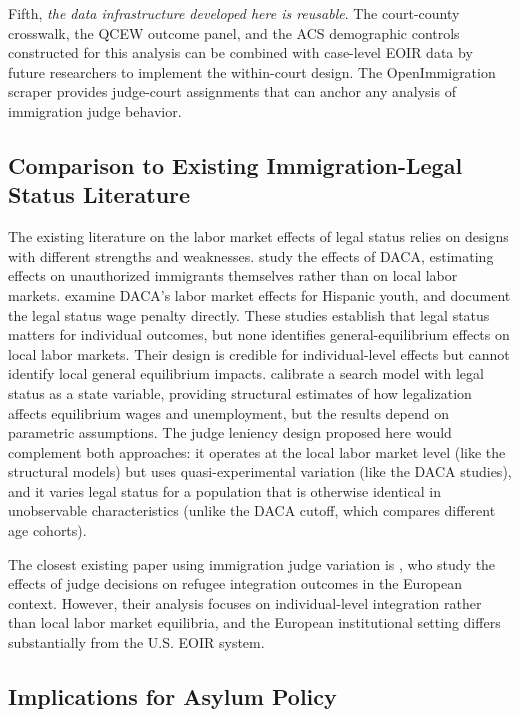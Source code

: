 \documentclass[12pt]{article}
\begin{document}
Fifth, \textit{the data infrastructure developed here is reusable}. The court-county crosswalk, the QCEW outcome panel, and the ACS demographic controls constructed for this analysis can be combined with case-level EOIR data by future researchers to implement the within-court design. The OpenImmigration scraper provides judge-court assignments that can anchor any analysis of immigration judge behavior.

\subsection{Comparison to Existing Immigration-Legal Status Literature}

The existing literature on the labor market effects of legal status relies on designs with different strengths and weaknesses. \citet{becker2022legal} study the effects of DACA, estimating effects on unauthorized immigrants themselves rather than on local labor markets. \citet{amuedodorantes2020daca} examine DACA's labor market effects for Hispanic youth, and \citet{orrenius2015wage} document the legal status wage penalty directly. These studies establish that legal status matters for individual outcomes, but none identifies general-equilibrium effects on local labor markets. Their design is credible for individual-level effects but cannot identify local general equilibrium impacts. \citet{chassamboulli2014labor} calibrate a search model with legal status as a state variable, providing structural estimates of how legalization affects equilibrium wages and unemployment, but the results depend on parametric assumptions. The judge leniency design proposed here would complement both approaches: it operates at the local labor market level (like the structural models) but uses quasi-experimental variation (like the DACA studies), and it varies legal status for a population that is otherwise identical in unobservable characteristics (unlike the DACA cutoff, which compares different age cohorts).

The closest existing paper using immigration judge variation is \citet{khan2023immigration}, who study the effects of judge decisions on refugee integration outcomes in the European context. However, their analysis focuses on individual-level integration rather than local labor market equilibria, and the European institutional setting differs substantially from the U.S. EOIR system.

\subsection{Implications for Asylum Policy}
\end{document}
